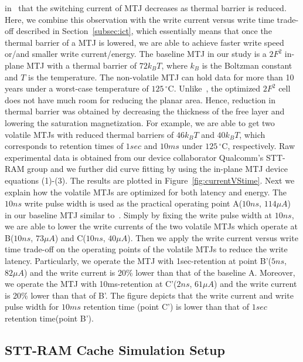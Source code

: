 in~\cite{STTRAM:Grandis11} that the switching current of MTJ decreases as thermal barrier is reduced. Here, we combine this observation with the write current versus write time trade-off described in Section~\ref{subsec:ict}, which essentially means that once the thermal barrier of a MTJ is lowered, we are able to achieve faster write speed or/and smaller write current/energy. The baseline MTJ in our study is a $2F^2$ in-plane MTJ with a thermal barrier of $72k_{B}T$, where $k_{B}$ is the Boltzman constant and $T$ is the temperature. The non-volatile MTJ can hold data for more than 10 years under a worst-case temperature of $125\,^{\circ}\mathrm{C}$. Unlike~\cite{STTRAM:HPCA11}, the optimized $2F^2$ cell does not have much room for reducing the planar area. Hence, reduction in thermal barrier was obtained by decreasing the thickness of the free layer and lowering the saturation magnetization. For example, we are able to get two volatile MTJs with reduced thermal barriers of $46k_{B}T$ and $40k_{B}T$, which corresponds to retention times of $1sec$ and $10ms$ under $125\,^{\circ}\mathrm{C}$, respectively. Raw experimental data is obtained from our device collaborator Qualcomm's STT-RAM group and we further did curve fitting by using the in-plane MTJ device equations (1)-(3). The results are plotted in Figure~\ref{fig:currentVStime}. Next we explain how the volatile MTJs are optimized for both latency and energy. The $10ns$ write pulse width is used as the practical operating point A($10ns$, $114\mu A$) in our baseline MTJ similar to~\cite{CACTI:DAC08:Dong}. Simply by fixing the write pulse width at $10ns$, we are able to lower the write currents of the two volatile MTJs which operate at B($10ns$, $73\mu A$) and C($10ns$, $40\mu A$). Then we apply the write current versus write time trade-off on the operating points of the volatile MTJs to reduce the write latency. Particularly, we operate the MTJ with 1sec-retention at point B'($5ns$, $82\mu A$) and the write current is 20\% lower than that of the baseline A. Moreover, we operate the MTJ with 10ms-retention at C'($2ns$, $61\mu A$) and the write current is 20\% lower than that of B'. The figure depicts that the write current and write pulse width for $10ms$ retention time (point C') is lower than that of $1sec$ retention time(point B').


\subsection{STT-RAM Cache Simulation Setup}

